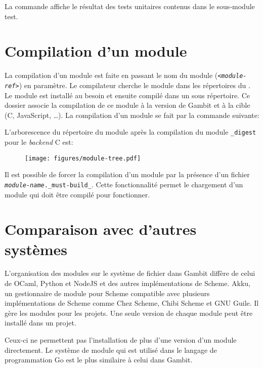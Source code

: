 La commande affiche le résultat des tests unitaires contenus dans le
sous-module test.


\section{Compilation d'un module}
%
La compilation d'un module est faite en passant le nom du module
(\texttt{\textit{<module-ref>}}) en paramètre.  Le compilateur cherche le
module dans les répertoires du . Le module est
installé au besoin et ensuite compilé dans un sous répertoire. Ce dossier associe
la compilation de ce module à la version de Gambit et à la cible (C, JavaScript, \dots).
La compilation d'un module se fait par la commande suivante:

\begin{center}
\end{center}

L'arborescence du répertoire du module après la compilation du module
\texttt{\_digest} pour le \textit{backend} C est:
%
\begin{figure}[ht]
  \centering
  \texttt{[image: figures/module-tree.pdf]}
\end{figure}

Il est possible de forcer la compilation d'un module par la présence d'un fichier
\texttt{\textit{module-name}.\_must-build\_}. Cette fonctionnalité permet le chargement d'un
module qui doit être compilé pour fonctionner.


\section{Comparaison avec d'autres systèmes}
L'organisation des modules sur le système de fichier dans Gambit diffère de
celui de OCaml, Python et NodeJS et des autres implémentations de Scheme.
Akku\cite{Akku.scm}, un gestionnaire de module pour Scheme compatible avec
plusieurs implémentations de Scheme comme Chez Scheme, Chibi Scheme et GNU
Guile. Il gère les modules pour les projets. Une seule version de chaque module
peut être installé dans un projet.

Ceux-ci ne permettent pas l'installation de plus d'une version d'un module
directement. Le système de module qui est utilisé dans le langage de
programmation Go est le plus similaire à celui dans Gambit.

